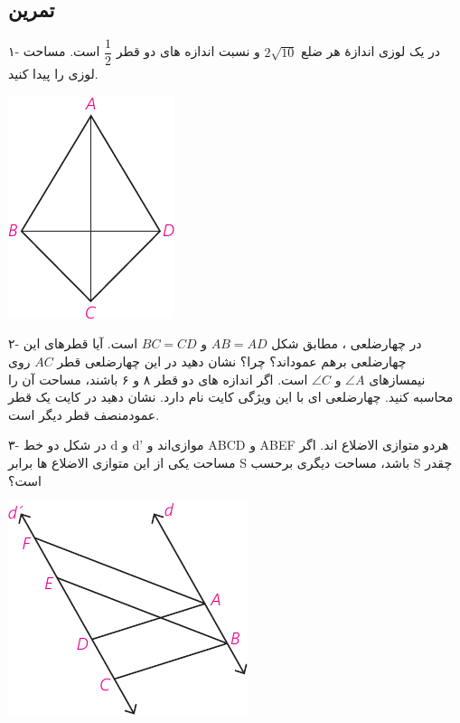 \documentclass[12pt, a4paper]{book}
\newenvironment{Figure}
{\par\medskip\noindent\minipage{\linewidth}}
{\endminipage\par\medskip}
\begin{document}
\subsection{تمرین}
\begin{multicols}{2}


{\medium ۱- }در یک لوزی اندازهٔ هر ضلع 
$2\sqrt{10}$
و نسبت اندازه های دو قطر
$\dfrac12$
است. مساحت لوزی را پیدا کنید.

\begin{Figure}
	\centering
	\includegraphics[scale=1.2]{"Shapes/Fasl - 3/Dars 2/P72-S1.pdf"}
\end{Figure}

\bigskip

{\medium ۲-} در چهارضلعی
،
مطابق شکل 
$AB = AD$
و
$BC = CD$
است. آیا قطرهای این چهارضلعی برهم عموداند؟ چرا؟ نشان دهید در این چهارضلعی قطر 
$AC$
روی نیمسازهای
$\angle A$
و
$\angle C$
است. اگر اندازه های دو قطر ۸ و ۶ باشند، مساحت آن را محاسبه کنید. چهارضلعی ای با این ویژگی کایت نام دارد. نشان دهید در کایت یک قطر عمودمنصف قطر دیگر است.
\bigskip

{\medium ۳-}
در شکل دو خط d و d' موازی‌اند و ABCD و ABEF هردو متوازی الاضلاع اند. اگر مساحت یکی از این متوازی الاضلاع ها برابر S باشد، مساحت دیگری برحسب S چقدر است؟

\begin{Figure}
	\centering
	\includegraphics[scale=1.2]{"Shapes/Fasl - 3/Dars 2/P72-S2.pdf"}
\end{Figure}


\end{multicols}
\end{document}
